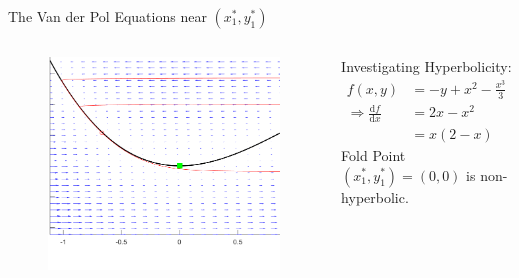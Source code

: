 \documentclass[11pt]{beamer}
\newcommand{\dif}{\mathrm{d}}
\begin{document}
\begin{frame}{The Van der Pol Equations near $(x_1^*,y_1^*)$ }
\begin{columns}
\begin{figure}[h!]
    \centering
    \includegraphics[width=\textwidth]{PPlanecrop.png}
\end{figure}


Investigating Hyperbolicity:
\begin{align*}
f(x,y)&= -y + x^2 - \frac{x^3}{3}\\
\Rightarrow \frac{\dif f}{\dif x}&= 2x -x^2 \\
&= x(2-x)
\end{align*}
\newline
\newline
Fold Point $(x_1^*,y_1^*)= (0,0) $ is non-hyperbolic.
\end{columns}
\end{frame}
\end{document}
